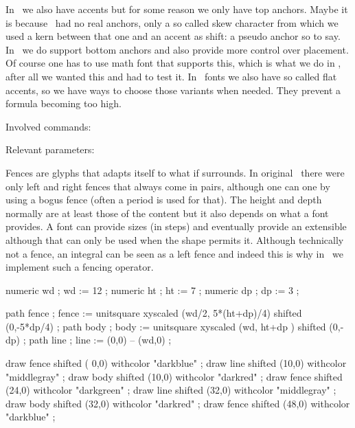In \OPENTYPE\ we also have accents but for some reason we only have top anchors.
Maybe it is because \TEX\ had no real anchors, only a so called skew character
from which we used a kern between that one and an accent as shift: a pseudo
anchor so to say. In \LUAMETATEX\ we do support bottom anchors and also provide
more control over placement. Of course one has to use math font that supports
this, which is what we do in \CONTEXT, after all we wanted this and had to test
it. In \OPENTYPE\ fonts we also have so called flat accents, so we have ways to
choose those variants when needed. They prevent a formula becoming too high.

Involved commands:

\starttyping
\Umathaccent
\stoptyping

Relevant parameters:

\starttyping
\Umathaccenttopshiftup
\Umathaccentbottomshiftdown
\Umathaccenttopovershoot
\Umathaccentbottomovershoot
\Umathaccentsuperscriptdrop
\Umathaccentsuperscriptpercent
\Umathaccentextendmargin
\Umathflattenedaccenttopshiftup
\Umathflattenedaccentbottomshiftdown
\stoptyping

\stopsection

\startsection[title=Math fences]

Fences are glyphs that adapts itself to what if surrounds. In original \TEX\
there were only left and right fences that always come in pairs, although one can
\quote {hide} one by using a bogus fence (often a period is used for that). The
height and depth normally are at least those of the content but it also depends
on what a font provides. A font can provide sizes (in steps) and eventually
provide an extensible although that can only be used when the shape permits it.
Although technically not a fence, an integral can be seen as a left fence and
indeed this is why in \LUAMETATEX\ we implement such a fencing operator.

\startlinecorrection
\startMPcode
    numeric wd ; wd := 12 ;
    numeric ht ; ht :=  7 ;
    numeric dp ; dp :=  3 ;

    path fence ; fence := unitsquare xyscaled (wd/2, 5*(ht+dp)/4) shifted (0,-5*dp/4) ;
    path body  ; body  := unitsquare xyscaled (wd,      ht+dp   ) shifted (0,-dp) ;
    path line  ; line  := (0,0) -- (wd,0) ;

    draw fence shifted ( 0,0) withcolor "darkblue" ;
    draw line  shifted (10,0) withcolor "middlegray" ;
    draw body  shifted (10,0) withcolor "darkred" ;
    draw fence shifted (24,0) withcolor "darkgreen" ;
    draw line  shifted (32,0) withcolor "middlegray" ;
    draw body  shifted (32,0) withcolor "darkred" ;
    draw fence shifted (48,0) withcolor "darkblue" ;

